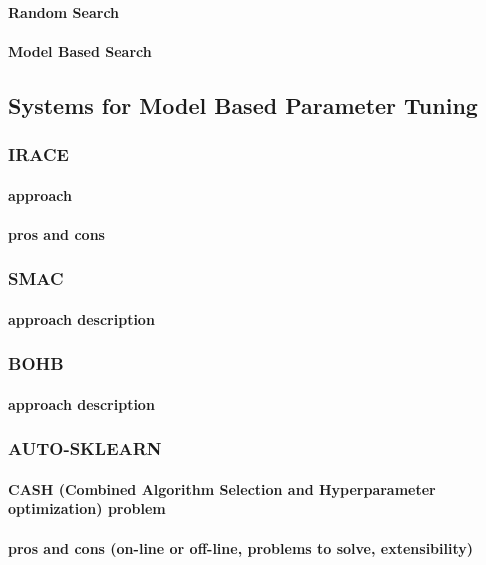 \paragraph{Random Search}
\paragraph{Model Based Search}

\subsection{Systems for Model Based Parameter Tuning}

\subsubsection{IRACE}
\paragraph{approach} \cite{irace:lopez2016irace}
\paragraph{pros and cons}

\subsubsection{SMAC}
\paragraph{approach description}

\subsubsection{BOHB}
\paragraph{approach description}

\subsubsection{AUTO-SKLEARN}
\paragraph{CASH (Combined Algorithm Selection and Hyperparameter optimization) problem}
\paragraph{pros and cons (on-line or off-line, problems to solve, extensibility)}\cite{autosklearn:feurer2015efficient}

